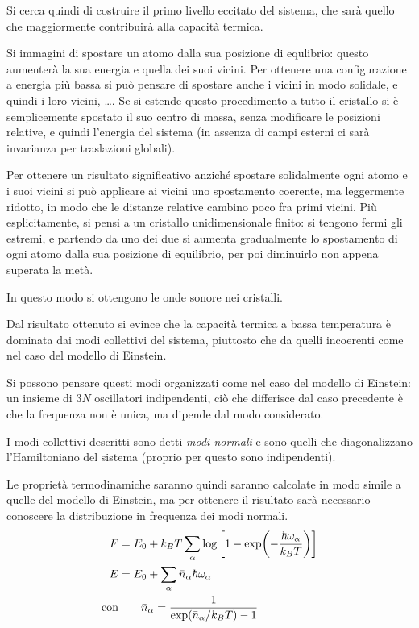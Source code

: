 Si cerca quindi di costruire il primo livello eccitato del sistema, che sarà quello che maggiormente contribuirà alla capacità termica.

Si immagini di spostare un atomo dalla sua posizione di equlibrio: questo aumenterà la sua energia e quella dei suoi vicini. Per ottenere una configurazione a energia più bassa si può pensare di spostare anche i vicini in modo solidale, e quindi i loro vicini, \dots.
Se si estende questo procedimento a tutto il cristallo si è semplicemente spostato il suo centro di massa, senza modificare le posizioni relative, e quindi l'energia del sistema (in assenza di campi esterni ci sarà invarianza per traslazioni globali).

Per ottenere un risultato significativo anziché spostare solidalmente ogni atomo e i suoi vicini si può applicare ai vicini uno spostamento coerente, ma leggermente ridotto, in modo che le distanze relative cambino poco fra primi vicini.
Più esplicitamente, si pensi a un cristallo unidimensionale finito: si tengono fermi gli estremi, e partendo da uno dei due si aumenta gradualmente lo spostamento di ogni atomo dalla sua posizione di equilibrio, per poi diminuirlo  non appena superata la metà.

In questo modo si ottengono le onde sonore nei cristalli.
\newline

Dal risultato ottenuto si evince che la capacità termica a bassa temperatura è dominata dai modi collettivi del sistema, piuttosto che da quelli incoerenti come nel caso del modello di Einstein.

Si possono pensare questi modi organizzati come nel caso del modello di Einstein: un insieme di $ 3N $ oscillatori indipendenti, ciò che differisce dal caso precedente è che la frequenza non è unica, ma dipende dal modo considerato.

\begin{defn}
	I modi collettivi descritti sono detti \textit{modi normali} e sono quelli che diagonalizzano l'Hamiltoniano del sistema (proprio per questo sono indipendenti).
\end{defn}

Le proprietà termodinamiche saranno quindi saranno calcolate in modo simile a quelle del modello di Einstein, ma per ottenere il risultato sarà necessario conoscere la distribuzione in frequenza dei modi normali.
\begin{align*}
	F &= E_0 + k_B T \sum_\alpha \log \left[1 - \exp(-\frac{\hbar \omega_\alpha}{k_B T})\right]\\
	E &= E_0 + \sum_{\alpha} \bar{n}_\alpha \hbar \omega_\alpha\\
	\text{con}	&\qquad  \bar{n}_\alpha = \frac{1}{\exp(\bar{n}_\alpha/k_B T) - 1}
\end{align*}

